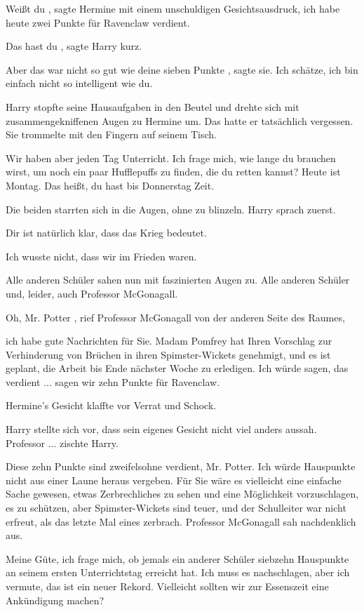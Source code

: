 \glqq Weißt du\grqq{} , sagte Hermine mit einem unschuldigen Gesichtsausdruck,
\glqq ich habe heute zwei Punkte für Ravenclaw verdient.\grqq{}

\glqq Das hast du\grqq{} , sagte Harry kurz.

\glqq Aber das war nicht so gut wie deine sieben Punkte\grqq{} , sagte sie.
\glqq Ich schätze, ich bin einfach nicht so intelligent wie du.\grqq{}

Harry stopfte seine Hausaufgaben in den Beutel und drehte sich mit
zusammengekniffenen Augen zu Hermine um. Das hatte er tatsächlich vergessen. Sie
trommelte mit den Fingern auf seinem Tisch.

\glqq Wir haben aber jeden Tag Unterricht. Ich frage mich, wie lange du brauchen
wirst, um noch ein paar Hufflepuffs zu finden, die du retten kannst? Heute ist
Montag. Das heißt, du hast bis Donnerstag Zeit.\grqq{}

Die beiden starrten sich in die Augen, ohne zu blinzeln. Harry sprach zuerst.

\glqq Dir ist natürlich klar, dass das Krieg bedeutet.\grqq{}

\glqq Ich wusste nicht, dass wir im Frieden waren.\grqq{}

Alle anderen Schüler sahen nun mit faszinierten Augen zu. Alle anderen Schüler
und, leider, auch Professor McGonagall.

\glqq Oh, Mr. Potter\grqq{} , rief Professor McGonagall von der anderen Seite
des Raumes,

\glqq ich habe gute Nachrichten für Sie. Madam Pomfrey hat Ihren Vorschlag zur
Verhinderung von Brüchen in ihren Spimster-Wickets genehmigt, und es ist
geplant, die Arbeit bis Ende nächster Woche zu erledigen. Ich würde sagen, das
verdient ... sagen wir zehn Punkte für Ravenclaw.\grqq{}

Hermine's Gesicht klaffte vor Verrat und Schock.

Harry stellte sich vor, dass sein eigenes Gesicht nicht viel anders aussah.
\glqq Professor ...\grqq{} zischte Harry.

\glqq Diese zehn Punkte sind zweifelsohne verdient, Mr. Potter. Ich würde
Hauspunkte nicht aus einer Laune heraus vergeben. Für Sie wäre es vielleicht
eine einfache Sache gewesen, etwas Zerbrechliches zu sehen und eine Möglichkeit
vorzuschlagen, es zu schützen, aber Spimster-Wickets sind teuer, und der
Schulleiter war nicht erfreut, als das letzte Mal eines zerbrach. Professor
McGonagall sah nachdenklich aus.

\glqq Meine Güte, ich frage mich, ob jemals ein anderer Schüler siebzehn
Hauspunkte an seinem ersten Unterrichtstag erreicht hat. Ich muss es
nachschlagen, aber ich vermute, das ist ein neuer Rekord. Vielleicht sollten wir
zur Essenszeit eine Ankündigung machen?\grqq{}

